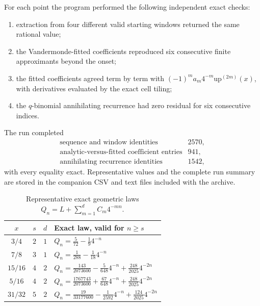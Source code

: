 \documentclass[11pt,oneside]{article}
\numberwithin{equation}{section}
\theoremstyle{definition}
\theoremstyle{remark}
\newcommand{\upf}{\mathrm{up}}
\begin{document}
For each point the program performed the following independent exact checks:

\begin{enumerate}
\item extraction from four different valid starting windows returned the same
rational value;
\item the Vandermonde-fitted coefficients reproduced six consecutive finite
approximants beyond the onset;
\item the fitted coefficients agreed term by term with
$(-1)^ma_m4^{-m}\upf^{(2m)}(x)$, with derivatives evaluated by the exact cell
tiling;
\item the $q$-binomial annihilating recurrence had zero residual for six
consecutive indices.
\end{enumerate}

The run completed
\begin{equation}
 \begin{array}{lr}
 \text{sequence and window identities} & 2570,\\
 \text{analytic-versus-fitted coefficient entries} & 941,\\
 \text{annihilating recurrence identities} & 1542,
 \end{array}
 \label{eq:verification-counts}
\end{equation}
with every equality exact.  Representative values and the complete run summary
are stored in the companion CSV and text files included with the archive.

\begin{table}[htbp]
\centering
\small
\caption{Representative exact geometric laws $Q_n=L+\sum_{m=1}^dC_m4^{-mn}$.}
\label{tab:representative-laws}
\begin{tabularx}{\textwidth}{@{}c c c X@{}}
\toprule
$x$ & $s$ & $d$ & Exact law, valid for $n\ge s$\\
\midrule
$3/4$ & $2$ & $1$ & $\displaystyle Q_n=\frac5{72}-\frac19 4^{-n}$\\[0.4em]
$7/8$ & $3$ & $1$ & $\displaystyle Q_n=\frac1{288}-\frac1{18}4^{-n}$\\[0.4em]
$15/16$ & $4$ & $2$ & $\displaystyle Q_n=\frac{143}{2073600}-\frac5{648}4^{-n}+\frac{248}{2025}4^{-2n}$\\[0.4em]
$5/16$ & $4$ & $2$ & $\displaystyle Q_n=\frac{1767743}{2073600}+\frac{67}{648}4^{-n}+\frac{248}{2025}4^{-2n}$\\[0.4em]
$31/32$ & $5$ & $2$ & $\displaystyle Q_n=\frac{19}{33177600}-\frac1{2592}4^{-n}+\frac{124}{2025}4^{-2n}$\\
\bottomrule
\end{tabularx}
\end{table}
\end{document}
